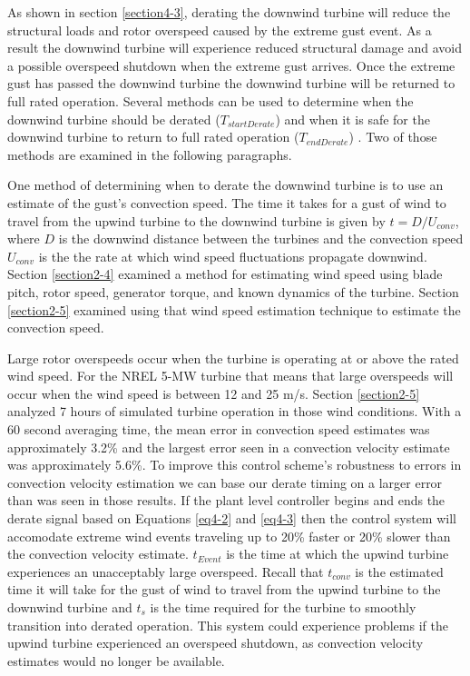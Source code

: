 As shown in section \ref{section4-3}, derating the downwind turbine will reduce the structural loads and rotor overspeed caused by the extreme gust event. As a result the downwind turbine will experience reduced structural damage and avoid a possible overspeed shutdown when the extreme gust arrives. Once the extreme gust has passed the downwind turbine the downwind turbine will be returned to full rated operation. Several methods can be used to determine when the downwind turbine should be derated ($T_{startDerate}$) and when it is safe for the downwind turbine to return to full rated operation ($T_{endDerate}$) . Two of those methods are examined in the following paragraphs.

One method of determining when to derate the downwind turbine is to use an estimate of the gust's convection speed. The time it takes for a gust of wind to travel from the upwind turbine to the downwind turbine is given by $t = D/U_{conv}$, where $D$ is the downwind distance between the turbines and the convection speed $U_{conv}$ is the the rate at which wind speed fluctuations propagate downwind. Section \ref{section2-4} examined a method for estimating wind speed using blade pitch, rotor speed, generator torque, and known dynamics of the turbine. Section \ref{section2-5} examined using that wind speed estimation technique to estimate the convection speed. 

Large rotor overspeeds occur when the turbine is operating at or above the rated wind speed. For the NREL 5-MW turbine that means that large overspeeds will occur when the wind speed is between 12 and 25 m/s. Section \ref{section2-5} analyzed 7 hours of simulated turbine operation in those wind conditions. With a 60 second averaging time, the mean error in convection speed estimates was approximately 3.2\% and the largest error seen in a convection velocity estimate was approximately 5.6\%. To improve this control scheme's robustness to errors in convection velocity estimation we can base our derate timing on a larger error than was seen in those results. If the plant level controller begins and ends the derate signal based on Equations \ref{eq4-2} and \ref{eq4-3} then the control system will accomodate extreme wind events traveling up to 20\% faster or 20\% slower than the convection velocity estimate. $t_{Event}$ is the time at which the upwind turbine experiences an unacceptably large overspeed. Recall that $t_{conv}$ is the estimated time it will take for the gust of wind to travel from the upwind turbine to the downwind turbine and $t_s$ is the time required for the turbine to smoothly transition into derated operation. This system could experience problems if the upwind turbine experienced an overspeed shutdown, as convection velocity estimates would no longer be available.


